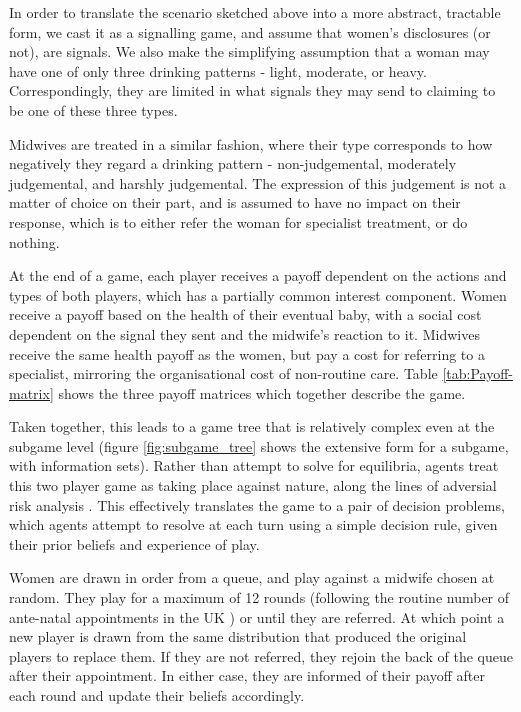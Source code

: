 In order to translate the scenario sketched above into a more abstract, tractable form, we cast it as a signalling game, and assume that women's disclosures (or not), are signals. We also make the simplifying assumption that a woman may have one of only three drinking patterns - light, moderate, or heavy. Correspondingly, they are limited in what signals they may send to claiming to be one of these three types.

Midwives are treated in a similar fashion, where their type corresponds to how negatively they regard a drinking pattern - non-judgemental, moderately judgemental, and harshly judgemental. The expression of this judgement is not a matter of choice on their part, and is assumed to have no impact on their response, which is to either refer the woman for specialist treatment, or do nothing.

At the end of a game, each player receives a payoff dependent on the actions and types of both players, which has a partially common interest component. Women receive a payoff based on the health of their eventual baby, with a social cost dependent on the signal they sent and the midwife's reaction to it. Midwives receive the same health payoff as the women, but pay a cost for referring to a specialist, mirroring the organisational cost of non-routine care. Table \ref{tab:Payoff-matrix} shows the three payoff matrices which together describe the game.

Taken together, this leads to a game tree that is relatively complex even at the subgame level (figure \ref{fig:subgame_tree} shows the extensive form for a subgame, with information sets). 
Rather than attempt to solve for equilibria, agents treat this two player game as taking place against nature, along the lines of adversial risk analysis \citep{RiosInsua2009}. This effectively translates the game to a pair of decision problems, which agents attempt to resolve at each turn using a simple decision rule, given their prior beliefs and experience of play.

Women are drawn in order from a queue, and play against a midwife chosen at random. They play for a maximum of 12 rounds (following the routine number of ante-natal appointments in the UK \citep{NICE2010a}) or until they are referred. At which point a new player is drawn from the same distribution that produced the original players to replace them. If they are not referred, they rejoin the back of the queue after their appointment. In either case, they are informed of their payoff after each round and update their beliefs accordingly.

